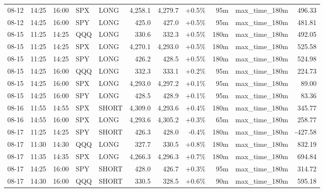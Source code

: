 \documentclass[11pt,a4paper,twoside]{article}
\begin{document}
\begin{center}
\begin{longtable}{>{\color{txtmain}}l l l l l r r r r >{\color{txtmain}}l r}
08-12 & 14:25 & 16:00 & SPX & LONG & 4,258.1 & 4,279.7 & \textcolor{wingreen}{+0.5\%} & 95m & max\_time\_180m & \textcolor{wingreen}{496.33} \\
08-12 & 14:25 & 16:00 & SPY & LONG & 425.0 & 427.0 & \textcolor{wingreen}{+0.5\%} & 95m & max\_time\_180m & \textcolor{wingreen}{481.81} \\
08-15 & 11:25 & 14:25 & QQQ & LONG & 330.6 & 332.3 & \textcolor{wingreen}{+0.5\%} & 180m & max\_time\_180m & \textcolor{wingreen}{492.05} \\
08-15 & 11:25 & 14:25 & SPX & LONG & 4,270.1 & 4,293.0 & \textcolor{wingreen}{+0.5\%} & 180m & max\_time\_180m & \textcolor{wingreen}{525.58} \\
08-15 & 11:25 & 14:25 & SPY & LONG & 426.2 & 428.5 & \textcolor{wingreen}{+0.5\%} & 180m & max\_time\_180m & \textcolor{wingreen}{524.98} \\
08-15 & 14:25 & 16:00 & QQQ & LONG & 332.3 & 333.1 & \textcolor{wingreen}{+0.2\%} & 95m & max\_time\_180m & \textcolor{wingreen}{224.73} \\
08-15 & 14:25 & 16:00 & SPX & LONG & 4,293.0 & 4,297.2 & \textcolor{wingreen}{+0.1\%} & 95m & max\_time\_180m & \textcolor{wingreen}{89.00} \\
08-15 & 14:25 & 16:00 & SPY & LONG & 428.5 & 428.9 & \textcolor{wingreen}{+0.1\%} & 95m & max\_time\_180m & \textcolor{wingreen}{83.36} \\
08-16 & 11:55 & 14:55 & SPX & SHORT & 4,309.0 & 4,293.6 & \textcolor{wingreen}{+0.4\%} & 180m & max\_time\_180m & \textcolor{wingreen}{345.77} \\
08-16 & 14:55 & 16:00 & SPX & LONG & 4,293.6 & 4,305.2 & \textcolor{wingreen}{+0.3\%} & 65m & max\_time\_180m & \textcolor{wingreen}{258.77} \\
08-17 & 11:25 & 14:25 & SPY & SHORT & 426.3 & 428.0 & \textcolor{lossred}{-0.4\%} & 180m & max\_time\_180m & \textcolor{lossred}{-427.58} \\
08-17 & 11:30 & 14:30 & QQQ & LONG & 327.7 & 330.5 & \textcolor{wingreen}{+0.8\%} & 180m & max\_time\_180m & \textcolor{wingreen}{832.19} \\
08-17 & 11:35 & 14:35 & SPX & LONG & 4,266.3 & 4,296.3 & \textcolor{wingreen}{+0.7\%} & 180m & max\_time\_180m & \textcolor{wingreen}{694.84} \\
08-17 & 14:25 & 16:00 & SPY & SHORT & 428.0 & 426.7 & \textcolor{wingreen}{+0.3\%} & 95m & max\_time\_180m & \textcolor{wingreen}{314.72} \\
08-17 & 14:30 & 16:00 & QQQ & SHORT & 330.5 & 328.5 & \textcolor{wingreen}{+0.6\%} & 90m & max\_time\_180m & \textcolor{wingreen}{595.18} \\

\end{longtable}
\end{center}
\end{document}
